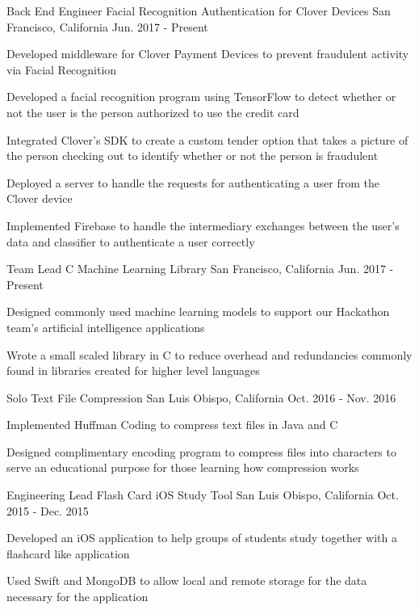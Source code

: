 \begin{cventries}
\cventry
{Back End Engineer} %
{Facial Recognition Authentication for Clover Devices} %
{San Francisco, California} %
{Jun. 2017 - Present} %
{ %
\begin{cvitems}
\item {Developed middleware for Clover Payment Devices to prevent fraudulent activity via Facial Recognition}
\item {Developed a facial recognition program using TensorFlow to detect whether or not the user is the person authorized to use the credit card}
\item {Integrated Clover's SDK to create a custom tender option that takes a picture of the person checking out to identify whether or not the person is fraudulent}
\item {Deployed a server to handle the requests for authenticating a user from the Clover device}
\item {Implemented Firebase to handle the intermediary exchanges between the user's data and classifier to authenticate a user correctly}
\end{cvitems}
}

\cventry
{Team Lead} %
{C Machine Learning Library} %
{San Francisco, California} %
{Jun. 2017 - Present} %
{ %
\begin{cvitems}
\item {Designed commonly used machine learning models to support our Hackathon team's artificial intelligence applications}
\item {Wrote a small scaled library in C to reduce overhead and redundancies commonly found in libraries created for higher level languages}
\end{cvitems}
}

\cventry
{Solo} %
{Text File Compression} %
{San Luis Obispo, California} %
{Oct. 2016 - Nov. 2016} %
{ %
\begin{cvitems}
\item {Implemented Huffman Coding to compress text files in Java and C}
\item {Designed complimentary encoding program to compress files into characters to serve an educational purpose for those learning how compression works}
\end{cvitems}
}


\cventry
{Engineering Lead} %
{Flash Card iOS Study Tool} %
{San Luis Obispo, California} %
{Oct. 2015 - Dec. 2015} %
{ %
\begin{cvitems}
\item {Developed an iOS application to help groups of students study together with a flashcard like application}
\item {Used Swift and MongoDB to allow local and remote storage for the data necessary for the application}
\end{cvitems}
}




\end{cventries}
